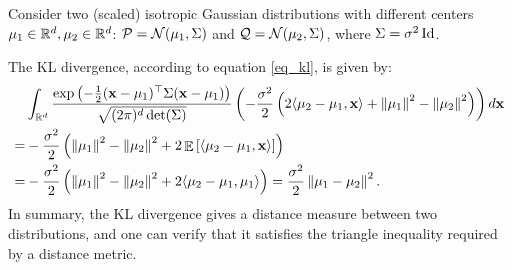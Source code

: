 \begin{example}\label{ex_kl_gauss}
    Consider two (scaled) isotropic Gaussian distributions with different centers $\mu_1 \in \mathbb{R}^d, \mu_2 \in \mathbb{R}^d$: $\mathcal{P} = \mathcal{N}(\mu_1, \Sigma)$ and $\mathcal{Q} = \mathcal{N}(\mu_2, \Sigma)$, where $\Sigma = \sigma^2 \operatorname{Id}$.

    The KL divergence, according to equation \eqref{eq_kl}, is given by:
    \begin{align}
        & \int_{\mathbb{R}^d} \frac{ \exp\left( - \frac 1 2  {(\mathbf{x} - \mu_1)^{\top} \Sigma (\mathbf{x} - \mu_1) }  \right) } { \sqrt{ (2\pi)^d \det(\Sigma)}}  \left( -\frac{\sigma^2} 2 \left( 2\langle \mu_2 - \mu_1, \mathbf{x} \rangle + \left\| \mu_1 \right\|^2 - \left\| \mu_2 \right\|^2 \right) \right) d\mathbf{x} \notag \\
        =& -\frac{\sigma^2}2\left(\left\| \mu_1 \right\|^2 - \left\| \mu_2 \right\|^2 + 2 \mathop{\mathbb{E}}\left[  \langle \mu_2 - \mu_1, \mathbf{x} \rangle  \right]\right) \notag \\
        =& -\frac{\sigma^2} 2 \left( \left\| \mu_1 \right\|^2 - \left\| \mu_2 \right\|^2 + 2\langle \mu_2 - \mu_1, \mu_1 \rangle \right) = \frac{\sigma^2} 2\left\| \mu_1 - \mu_2 \right\|^2.  \label{eq_kl_gaussian}
    \end{align}
    In summary, the KL divergence gives a distance measure between two distributions, and one can verify that it satisfies the triangle inequality required by a distance metric.
\end{example}

